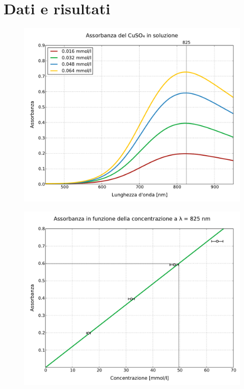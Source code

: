 \section*{Dati e risultati}

\begin{figure}
    \includegraphics[scale=0.5]{concentrazioni.pdf}
    \caption{}
    \label{fig:conc}
\end{figure}

\begin{figure}
    \includegraphics[scale=0.5]{retta.pdf}
    \caption{}
    \label{fig:a_vs_c}
\end{figure}
